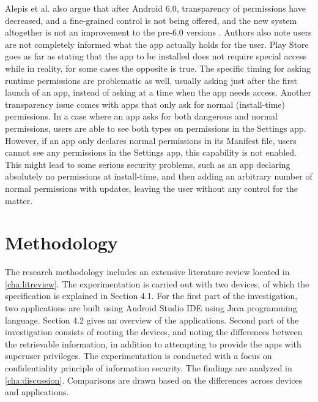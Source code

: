 \documentclass[
  a4paper,  %
  twoside,  %
  bibliography=totoc,
  headsepline,
  cleardoublepage=empty,
  parskip=half,
  draft=false,
  open=any
]{scrbook}
\begin{document}
Alepis et al. also argue that after Android 6.0, transparency of permissions have decreased, and a fine-grained control is not being offered, and the new system altogether is not an improvement to the pre-6.0 versions \cite{alepis2017}. Authors also note users are not completely informed what the app actually holds for the user. Play Store goes as far as stating that the app to be installed does not require special access while in reality, for some cases the opposite is true. The specific timing for asking runtime permissions are problematic as well, usually asking just after the first launch of an app, instead of asking at a time when the app needs access. Another transparency issue comes with apps that only ask for normal (install-time) permissions. In a case where an app asks for both dangerous and normal permissions, users are able to see both types on permissions in the Settings app. However, if an app only declares normal permissions in its Manifest file, users cannot see any permissions in the Settings app, this capability is not enabled. This might lead to some serious security problems, such as an app declaring absolutely no permissions at install-time, and then adding an arbitrary number of normal permissions with updates, leaving the user without any control for the matter.




\chapter{Methodology}
\label{cha:methodology}
The research methodology includes an extensive literature review located in \cref{cha:litreview}. The experimentation is carried out with two devices, of which the specification is explained in Section 4.1. For the first part of the investigation, two applications are built using Android Studio IDE using Java programming language. Section 4.2 gives an overview of the applications. Second part of the investigation consists of rooting the devices, and noting the differences between the retrievable information, in addition to attempting to provide the apps with superuser privileges. The experimentation is conducted with a focus on confidentiality principle of information security. The findings are analyzed in \cref{cha:discussion}. Comparisons are drawn based on the differences across devices and applications.   
\end{document}
